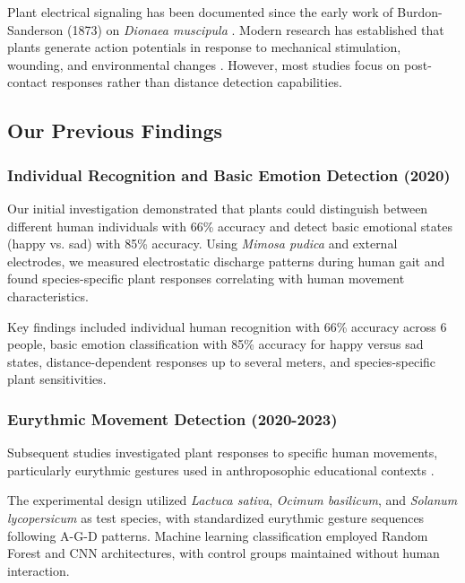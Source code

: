 \documentclass{article}
\begin{document}
Plant electrical signaling has been documented since the early work of Burdon-Sanderson (1873) on \textit{Dionaea muscipula} \cite{burdon1873note}. Modern research has established that plants generate action potentials in response to mechanical stimulation, wounding, and environmental changes \cite{fromm2007electrical, galle2015environmental}. However, most studies focus on post-contact responses rather than distance detection capabilities.

\subsection{Our Previous Findings}

\subsubsection{Individual Recognition and Basic Emotion Detection (2020)}

Our initial investigation \cite{oezkaya2020recognizing} demonstrated that plants could distinguish between different human individuals with 66\% accuracy and detect basic emotional states (happy vs. sad) with 85\% accuracy. Using \textit{Mimosa pudica} and external electrodes, we measured electrostatic discharge patterns during human gait and found species-specific plant responses correlating with human movement characteristics.

Key findings included individual human recognition with 66\% accuracy across 6 people, basic emotion classification with 85\% accuracy for happy versus sad states, distance-dependent responses up to several meters, and species-specific plant sensitivities.

\subsubsection{Eurythmic Movement Detection (2020-2023)}

Subsequent studies investigated plant responses to specific human movements, particularly eurythmic gestures used in anthroposophic educational contexts \cite{duerr2020eurythmic, de2023can, gil2024can}.

The experimental design utilized \textit{Lactuca sativa}, \textit{Ocimum basilicum}, and \textit{Solanum lycopersicum} as test species, with standardized eurythmic gesture sequences following A-G-D patterns. Machine learning classification employed Random Forest and CNN architectures, with control groups maintained without human interaction.
\end{document}
